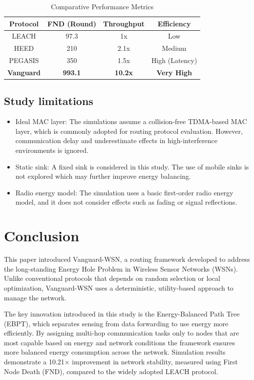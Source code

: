 \documentclass[conference]{IEEEtran}
\begin{document}
\begin{table}[htbp]
\caption{Comparative Performance Metrics}
\begin{center}
\begin{tabular}{|c|c|c|c|}
\hline
\textbf{Protocol} & \textbf{FND (Round)} & \textbf{Throughput} & \textbf{Efficiency} \\
\hline
LEACH & 97.3 & 1x & Low \\
HEED & 210 & 2.1x & Medium \\
PEGASIS & 350 & 1.5x & High (Latency) \\
\textbf{Vanguard} & \textbf{993.1} & \textbf{10.2x} & \textbf{Very High} \\
\hline
\end{tabular}
\label{tab2}
\end{center}
\end{table}

\subsection{Study limitations}
\begin{itemize}
    \item Ideal MAC layer: The simulations assume a collision-free TDMA-based MAC layer, which is commonly adopted for routing protocol evaluation. However, communication delay and underestimate effects in high-interference environments is ignored.
    \item Static sink: A fixed sink is considered in this study. The use of mobile sinks is not explored which may further improve energy balancing.
    \item Radio energy model: The simulation uses a basic first-order radio energy model, and it does not consider effects such as fading or signal reflections.
\end{itemize}

\section{Conclusion}
This paper introduced Vanguard-WSN, a routing framework developed to address the long-standing Energy Hole Problem in Wireless Sensor Networks (WSNs). Unlike conventional protocols that depends on random selection or local optimization, Vanguard-WSN uses a deterministic, utility-based approach to manage the network.

The key innovation introduced in this study is the Energy-Balanced Path Tree (EBPT), which separates sensing from data forwarding to use energy more efficiently. By assigning multi-hop communication tasks only to nodes that are most capable based on energy and network conditions the framework ensures more balanced energy consumption across the network. Simulation results demonstrate a 10.21$\times$ improvement in network stability, measured using First Node Death (FND), compared to the widely adopted LEACH protocol.
\end{document}
